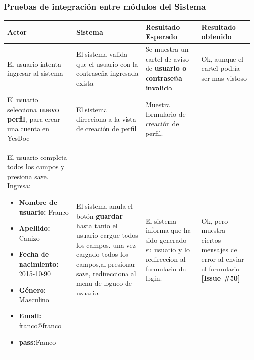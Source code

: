 \documentclass[a4paper,12pt]{article}
\begin{document}
\subsubsection{Pruebas  de  integración  entre módulos del Sistema}


\begin{longtable}{|p{4cm}|p{4cm}|p{4cm}|p{3cm}|}
\hline
Actor  & Sistema& Resultado Esperado & Resultado obtenido \\ \hline

El usuario intenta ingresar al sistema & El sistema valida que el usuario con la contraseña ingresada exista 
& Se muestra un cartel de aviso de \textbf{usuario o contraseña invalido} 
& Ok, aunque el cartel podría ser mas vistoso 
\\ \hline



El usuario selecciona \textbf{nuevo perfil}, para
crear una cuenta en YesDoc 
& El sistema direcciona a la vista de creación de perfil
& Muestra formulario de creación de perfil.
&
\\ \hline



 El usuario completa todos los campos y presiona save.
 Ingresa:
\begin{itemize}
	\item \textbf{Nombre de usuario:} Franco
	\item \textbf{Apellido:} Canizo
	\item \textbf{Fecha de nacimiento: }2015-10-90
	\item \textbf{Género: }Masculino
	\item \textbf{Email: }franco@franco
	\item \textbf{pass:}Franco

\end{itemize}
& El sistema anula el botón \textbf{guardar }hasta tanto el usuario cargue todos los campos. una vez cargado todos los campos,al presionar save, redirecciona al menu
de logueo de usuario.
& El sistema informa que ha sido generado su usuario y lo redireccion al formulario de login.
& Ok, pero muestra ciertos mensajes de error al enviar el formulario \textbf{[Issue \#50]}
\\ \hline




\end{longtable}
\end{document}
